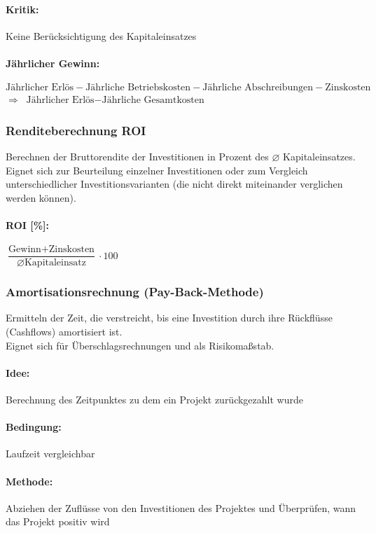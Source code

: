 \paragraph{Kritik:} Keine Berücksichtigung des Kapitaleinsatzes

\paragraph{Jährlicher Gewinn:} $\text{Jährlicher Erlös} - \text{Jährliche Betriebskosten} - \text{Jährliche Abschreibungen} - \text{Zinskosten}$\\
$\Rightarrow$ $\text{Jährlicher Erlös} - \text{Jährliche Gesamtkosten}$

\clearpage
\subsubsection{Renditeberechnung ROI}
Berechnen der Bruttorendite der Investitionen in Prozent des $\varnothing$ Kapitaleinsatzes.\\
Eignet sich zur Beurteilung einzelner Investitionen oder zum Vergleich unterschiedlicher Investitionsvarianten (die nicht direkt miteinander verglichen werden können).

\paragraph{ROI [\%]:} $\dfrac{\text{Gewinn} + \text{Zinskosten}}{\varnothing \text{Kapitaleinsatz}}\cdot 100$

\clearpage
\subsubsection{Amortisationsrechnung (Pay-Back-Methode)}
Ermitteln der Zeit, die verstreicht, bis eine Investition durch ihre Rückflüsse (Cashflows) amortisiert ist.\\
Eignet sich für Überschlagsrechnungen und als Risikomaßstab.

\paragraph{Idee:} Berechnung des Zeitpunktes zu dem ein Projekt zurückgezahlt wurde

\paragraph{Bedingung:} Laufzeit vergleichbar
\paragraph{Methode:} Abziehen der Zuflüsse von den Investitionen des Projektes und Überprüfen, wann das Projekt positiv wird

